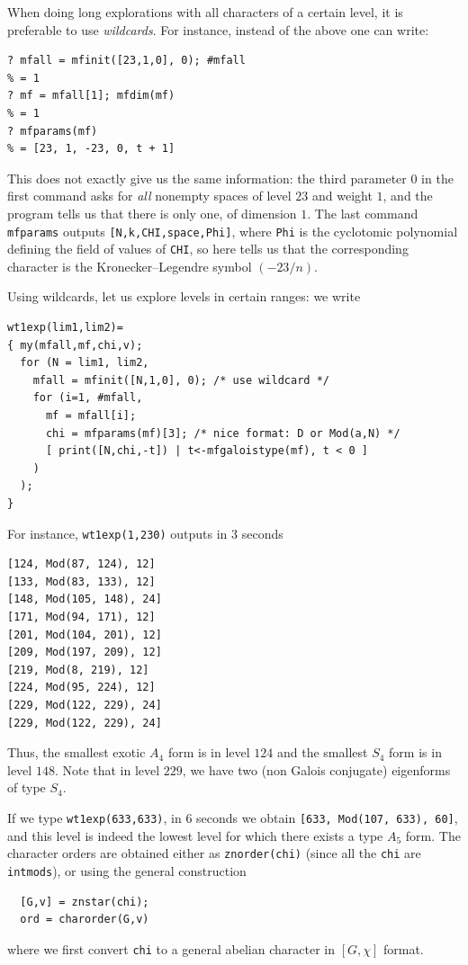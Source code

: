 \documentclass[11pt]{article}
\def\kbd#1{{\tt #1}}
\begin{document}
When doing long explorations with all characters of a certain level, it
is preferable to use \emph{wildcards}. For instance, instead of the above
one can write:

\begin{verbatim}
? mfall = mfinit([23,1,0], 0); #mfall
% = 1
? mf = mfall[1]; mfdim(mf)
% = 1
? mfparams(mf)
% = [23, 1, -23, 0, t + 1]
\end{verbatim}

This does not exactly give us the same information: the third parameter $0$
in the first command asks for \emph{all} nonempty spaces of level $23$ and
weight $1$, and the program tells us that there is only one, of dimension $1$.
The last command \kbd{mfparams} outputs \kbd{[N,k,CHI,space,Phi]}, where
\kbd{Phi} is the cyclotomic polynomial defining the field of values of
\kbd{CHI}, so here tells us that the corresponding character is the
Kronecker--Legendre symbol $(-23/n)$.

Using wildcards, let us explore levels in certain ranges: we write
\begin{verbatim}
wt1exp(lim1,lim2)=
{ my(mfall,mf,chi,v);
  for (N = lim1, lim2,
    mfall = mfinit([N,1,0], 0); /* use wildcard */
    for (i=1, #mfall,
      mf = mfall[i];
      chi = mfparams(mf)[3]; /* nice format: D or Mod(a,N) */
      [ print([N,chi,-t]) | t<-mfgaloistype(mf), t < 0 ]
    )
  );
}
\end{verbatim}

For instance, \kbd{wt1exp(1,230)} outputs in 3 seconds

\begin{verbatim}
[124, Mod(87, 124), 12]
[133, Mod(83, 133), 12]
[148, Mod(105, 148), 24]
[171, Mod(94, 171), 12]
[201, Mod(104, 201), 12]
[209, Mod(197, 209), 12]
[219, Mod(8, 219), 12]
[224, Mod(95, 224), 12]
[229, Mod(122, 229), 24]
[229, Mod(122, 229), 24]
\end{verbatim}

Thus, the smallest exotic $A_4$ form is in level $124$ and the smallest $S_4$
form is in level $148$. Note that in level $229$, we have two (non Galois
conjugate) eigenforms of type $S_4$.

If we type \kbd{wt1exp(633,633)}, in 6 seconds we obtain \kbd{[633, Mod(107,
633), 60]}, and this level is indeed the lowest level for which there exists
a type $A_5$ form. The character orders are obtained either as
\kbd{znorder(chi)} (since all the \kbd{chi} are \kbd{intmods}), or
using the general construction
\begin{verbatim}
  [G,v] = znstar(chi);
  ord = charorder(G,v)
\end{verbatim}
where we first convert \kbd{chi} to a general abelian character in
$[G,\chi]$ format.
\end{document}

